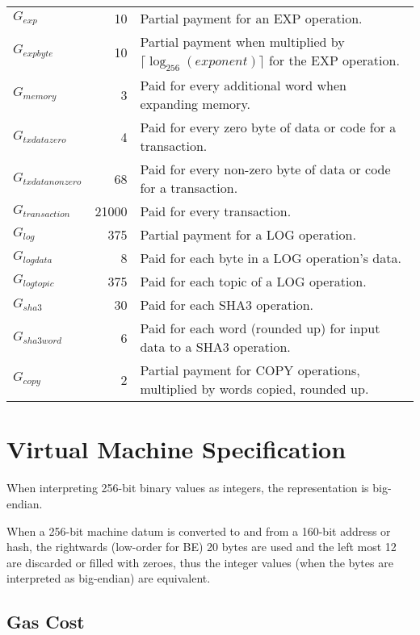 \documentclass[9pt,oneside]{amsart}
\begin{document}
\begin{tabular*}{\columnwidth}[h]{lrl}
$G_{exp}$ & 10 & Partial payment for an {\small EXP} operation. \\
$G_{expbyte}$ & 10 & Partial payment when multiplied by $\lceil\log_{256}(exponent)\rceil$ for the {\small EXP} operation. \\
$G_{memory}$ & 3 & Paid for every additional word when expanding memory. \\
$G_{txdatazero}$ & 4 & Paid for every zero byte of data or code for a transaction. \\
$G_{txdatanonzero}$ & 68 & Paid for every non-zero byte of data or code for a transaction. \\
$G_{transaction}$ & 21000 & Paid for every transaction. \\
$G_{log}$ & 375 & Partial payment for a {\small LOG} operation. \\
$G_{logdata}$ & 8 & Paid for each byte in a {\small LOG} operation's data. \\
$G_{logtopic}$ & 375 & Paid for each topic of a {\small LOG} operation. \\
$G_{sha3}$ & 30 & Paid for each {\small SHA3} operation. \\
$G_{sha3word}$ & 6 & Paid for each word (rounded up) for input data to a {\small SHA3} operation. \\
$G_{copy}$ & 2 & Partial payment for {\small *COPY} operations, multiplied by words copied, rounded up. \\

\bottomrule
\end{tabular*}

\section{Virtual Machine Specification}\label{app:vm}

When interpreting 256-bit binary values as integers, the representation is big-endian.

When a 256-bit machine datum is converted to and from a 160-bit address or hash, the rightwards (low-order for BE) 20 bytes are used and the left most 12 are discarded or filled with zeroes, thus the integer values (when the bytes are interpreted as big-endian) are equivalent.

\subsection{Gas Cost}
\end{document}
